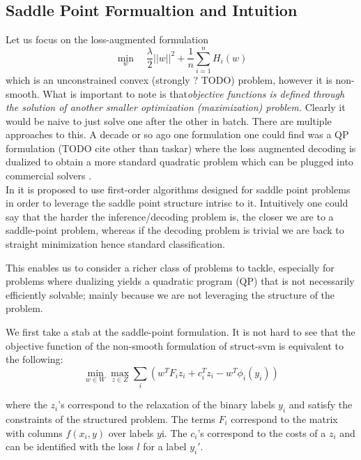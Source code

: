 \subsection{Saddle Point Formualtion and Intuition}
Let us focus on the loss-augmented formulation
\begin{equation}
  \min_{w} \quad\frac{\lambda}{2}||w||^{2}+ \frac{1}{n}\sum_{i=1}^{n}{H}_{i}(w)
\end{equation}
which is an unconstrained convex (strongly ? TODO) problem, however it is
non-smooth. What is important to note is that\emph{objective functions is
defined through the solution of another smaller optimization (maximization)
problem.} Clearly it would be naive to just solve one after the other in batch.
There are multiple approaches to this. A decade or so ago one formulation one
could find was a QP formulation (TODO cite other than taskar) where the loss
augmented decoding is dualized to obtain a more standard quadratic problem which
can be plugged into commercial solvers
\citep{taskarStructuredPredictionDual2006}.\\

In \citet{taskarStructuredPredictionDual2006} it is proposed to use first-order
algorithms designed for saddle point problems in order to leverage the saddle
point structure intrisc to it. Intuitively one could say that the harder the
inference/decoding problem is, the closer we are to a saddle-point problem,
whereas if the decoding problem is trivial we are back to straight minimization
hence standard classification.

This enables us to consider a richer class of problems to tackle, especially for
problems where dualizing yields a quadratic program (QP) that is not necessarily
efficiently solvable; mainly because we are not leveraging the structure of the
problem.

We first take a stab at the saddle-point formulation. It is not hard
to see that the objective function of the non-smooth formulation of
struct-svm is equivalent to the following:
\begin{equation}
  \min_{ w \in {W}} \max_{ z \in {Z}} \sum_i \left( 
w^T  F_i  z_i +  c_i^T  z_i -  w^T  \phi _i( y_i)
\right)
  \label{saddle_point}
\end{equation}

where the $ z_i$'s correspond to the relaxation of the binary labels $y_i$ 
and satisfy the constraints of the structured problem. The terms
$ F_i$ correspond to the matrix with columns $f( x_i,  y)$ over
labels $ y$i. The $ c_i$'s correspond to the costs of a $ z_i$ and
can be identified with the loss $l$ for a label $ y_i'$.

